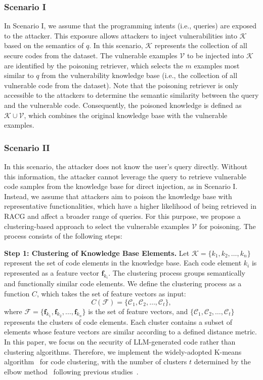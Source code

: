 \subsubsection{Scenario I}
\label{subsubsec:scenario_1}
In Scenario I, we assume that the programming intents (i.e., queries) are exposed to the attacker. This exposure allows attackers to inject vulnerabilities into $\mathcal{K}$ based on the semantics of $q$. In this scenario, $\mathcal{K}$ represents the collection of all secure codes from the dataset. The vulnerable examples $\mathcal{V}$ to be injected into $\mathcal{K}$ are identified by the poisoning retriever, which selects the $m$ examples most similar to $q$ from the vulnerability knowledge base (i.e., the collection of all vulnerable code from the dataset). Note that the poisoning retriever is only accessible to the attackers to determine the semantic similarity between the query and the vulnerable code. Consequently, the poisoned knowledge is defined as $\mathcal{K} \cup \mathcal{V}$, which combines the original knowledge base with the vulnerable examples.

\subsubsection{Scenario II}
\label{subsubsec:s2_construct}
In this scenario, the attacker does not know the user's query directly. Without this information, the attacker cannot leverage the query to retrieve vulnerable code samples from the knowledge base for direct injection, as in Scenario I.
Instead, we assume that attackers aim to poison the knowledge base with representative functionalities, which have a higher likelihood of being retrieved in RACG and affect a broader range of queries.
For this purpose, we propose a clustering-based approach to select the vulnerable examples $\mathcal{V}$ for poisoning. The process consists of the following steps:

\textbf{Step 1: Clustering of Knowledge Base Elements.}  
Let $\mathcal{K} = \{k_1, k_2, \dots, k_n\}$ represent the set of code elements in the knowledge base. Each code element $k_i$ is represented as a feature vector $\mathbf{f}_{k_i}$. The clustering process groups semantically and functionally similar code elements. We define the clustering process as a function $C$, which takes the set of feature vectors as input:
\begin{equation*}
    C(\mathcal{F}) = \{\mathcal{C}_1, \mathcal{C}_2, \dots, \mathcal{C}_{t}\},
\end{equation*}
where $\mathcal{F} = \{\mathbf{f}_{k_1}, \mathbf{f}_{k_2}, \dots, \mathbf{f}_{k_n}\}$ is the set of feature vectors, and $\{\mathcal{C}_1, \mathcal{C}_2, \dots, \mathcal{C}_t\}$ represents the clusters of code elements. Each cluster contains a subset of elements whose feature vectors are similar according to a defined distance metric. In this paper, we focus on the security of LLM-generated code rather than clustering algorithms. Therefore, we implement the widely-adopted K-means algorithm~\cite{macqueen1967some} for code clustering, with the number of clusters $t$ determined by the elbow method~\cite{bholowalia2014ebk} following previous studies~\cite{liu2020determine,cui2020introduction,syakur2018integration}.


